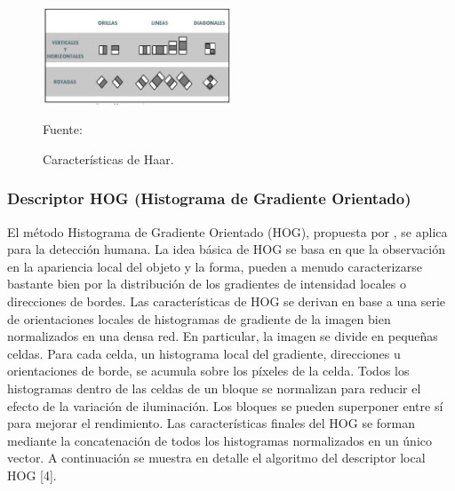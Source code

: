 \begin{figure}[ht]
\begin{center}
\includegraphics[width=0.5\textwidth]{Imagen18}
\end{center}
\begin{center}
\vskip -0.5cm
\caption{\small{Características de Haar.}}
{\small{Fuente: \cite{FALTA}}}
\end{center}
\end{figure}

\subsubsection{Descriptor HOG (Histograma de Gradiente Orientado)}
El método Histograma de Gradiente Orientado (HOG), propuesta por , se aplica para la detección humana. La idea básica de HOG se basa en que la observación en la apariencia local del objeto y la forma, pueden a menudo caracterizarse bastante bien por la distribución de los gradientes de intensidad locales o direcciones de bordes. Las características de HOG se derivan en base a una serie de orientaciones locales de histogramas de gradiente de la imagen bien normalizados en una densa red. En particular, la imagen se divide en pequeñas celdas. Para cada celda, un histograma local del gradiente, direcciones u orientaciones de borde, se acumula sobre los píxeles de la celda. Todos los histogramas dentro de las celdas de un bloque se normalizan para reducir el efecto de la variación de iluminación. Los bloques se pueden superponer entre sí para mejorar el rendimiento. Las características finales del HOG se forman mediante la concatenación de todos los histogramas normalizados en un único vector. A continuación se muestra en detalle el algoritmo del descriptor local HOG [4].

